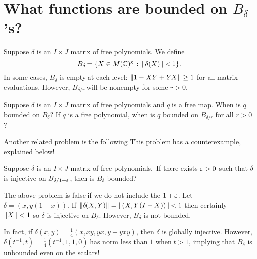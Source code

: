 \documentclass[oneside]{amsbook}
\numberwithin{equation}{section}
\begin{document}
\section{What functions are bounded on $B_{\delta}$'s?}

Suppose $\delta$ is an $I\times J$ matrix of free polynomials.
We define
\[
	B_\delta = {\left\{X\in M(\mathbb{C})^{\texttt{g}} \, :\, {\left\Vert\delta(X)\right\Vert}<1\right\}}.
\]
In some cases, $B_\delta$ is empty at each level: ${\left\Vert1 - XY + YX\right\Vert}\geq 1$ for all matrix evaluations.
However, $B_{\delta/r}$ will be nonempty for some $r>0$.

\begin{problem}
	Suppose $\delta$ is an $I\times J$ matrix of free polynomials and $q$ is a free map.
	When is $q$ bounded on $B_\delta$? If $q$ is a free polynomial, when is $q$ bounded on $B_{\delta/r}$ for all $r>0$?
\end{problem}

Another related problem is the following {\color{red} This problem has a counterexample, explained below!}

\begin{problem}
	Suppose $\delta$ is an $I\times J$ matrix of free polynomials.\
	If there exists $\varepsilon>0$ such that $\delta$ is injective on $B_{\delta/1+\varepsilon}$, then is $B_\delta$ bounded?
\end{problem}

The above problem is false if we do not include the $1+\varepsilon$. Let $\delta = (x, y(1-x))$.
If ${\left\Vert\delta(X,Y)\right\Vert} = {\left\Vert(X,Y(I-X))\right\Vert}<1$ then certainly ${\left\Vert X\right\Vert}<1$ so $\delta$ is injective on $B_\delta$.
However, $B_\delta$ is not bounded.

In fact, if $\delta(x,y) = \frac{1}{4}(x, xy, yx, y - yxy)$, then $\delta$ is globally injective.
However, $\delta(t^{-1}, t) = \frac{1}{4}(t^{-1}, 1, 1, 0)$ has norm less than $1$ when $t>1$, implying that $B_\delta$ is unbounded even on 
the scalars!
\end{document}
